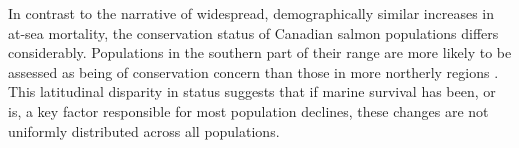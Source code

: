 \documentclass[12pt]{article}
\begin{document}


In contrast to the narrative of widespread, demographically similar increases
in at-sea mortality, the conservation status of Canadian salmon populations differs
considerably. Populations in the southern part of their range are more
likely to be assessed as being of conservation concern than those in more
northerly regions \citep{Cosewic2010}. This latitudinal disparity in status
suggests that if marine survival has been, or is, a key factor responsible for
most population declines, these changes are not uniformly distributed across
all populations. 


\end{document}
